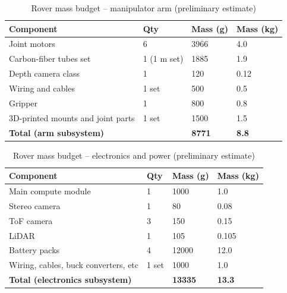\begin{table}[H]
\centering
\caption{Rover mass budget -- manipulator arm (preliminary estimate)}
\label{tab:mass_budget_arm_placeholder}
\setlength{\tabcolsep}{7pt}
\begin{tabular}{@{}
  l
  l
  l
  l
  @{}}
\toprule
\textbf{Component} &
\textbf{Qty} &
\textbf{Mass (g)} &
\textbf{Mass (kg)} \\
\midrule
Joint motors                              & 6 & 3966 & 4.0 \\
Carbon-fiber tubes set                    & 1 (1 m set) & 1885 & 1.9 \\
Depth camera class                        & 1 & 120 & 0.12 \\
Wiring and cables                         & 1 set & 500 & 0.5 \\
Gripper                                   & 1 & 800 & 0.8 \\
3D-printed mounts and joint parts         & 1 set & 1500 & 1.5 \\
\midrule
\textbf{Total (arm subsystem)}
  & & \textbf{8771} & \textbf{8.8} \\
\bottomrule
\end{tabular}
\end{table}

\begin{table}[H]
\centering
\caption{Rover mass budget -- electronics and power (preliminary estimate)}
\label{tab:mass_budget_electronics_placeholder}
\setlength{\tabcolsep}{7pt}
\begin{tabular}{@{}
  l
  l
  l
  l
  @{}}
\toprule
\textbf{Component} &
\textbf{Qty} &
\textbf{Mass (g)} &
\textbf{Mass (kg)} \\
\midrule
Main compute module & 1 & 1000 & 1.0 \\
Stereo camera                       & 1 & 80 & 0.08 \\
ToF camera                          & 3 & 150 & 0.15 \\
LiDAR                               & 1 & 105 & 0.105 \\
Battery packs                       & 4 & 12000 & 12.0 \\
Wiring, cables, buck converters, etc & 1 set & 1000 & 1.0 \\
\midrule
\textbf{Total (electronics subsystem)}
  & & \textbf{13335} & \textbf{13.3} \\
\bottomrule
\end{tabular}
\end{table}

